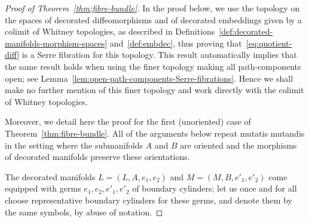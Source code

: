 \documentclass[10pt,a4paper]{amsart}
\numberwithin{equation}{section}
\theoremstyle{definition}
\theoremstyle{remark}
\begin{document}
\begin{proof}[Proof of Theorem~\ref{thm:fibre-bundle}]
In the proof below, we use the topology on the spaces of decorated diffeomorphisms and of decorated embeddings given by a colimit of Whitney topologies, as described in Definitions~\ref{def:decorated-manifolds-morphism-spaces} and~\ref{def:embdec}, thus proving that~\eqref{eq:quotient-diff} is a Serre fibration for this topology. This result automatically implies that the same result holds when using the finer topology making all path-components open; see Lemma~\ref{lem:open-path-components-Serre-fibrations}. Hence we shall make no further mention of this finer topology and work directly with the colimit of Whitney topologies.

Moreover, we detail here the proof for the first (unoriented) case of Theorem~\ref{thm:fibre-bundle}. All of the arguments below repeat mutatis mutandis in the setting where the submanifolds $A$ and $B$ are oriented and the morphisms of decorated manifolds preserve these orientations.

The decorated manifolds $L = (L,A,e_{1},e_{2})$ and $M = (M,B,e'_{1},e'_{2})$ come equipped with germs $e_{1},e_{2},e'_{1},e'_{2}$ of boundary cylinders; let us once and for all choose representative boundary cylinders for these germs, and denote them by the same symbols, by abuse of notation.


\end{proof}
\end{document}
